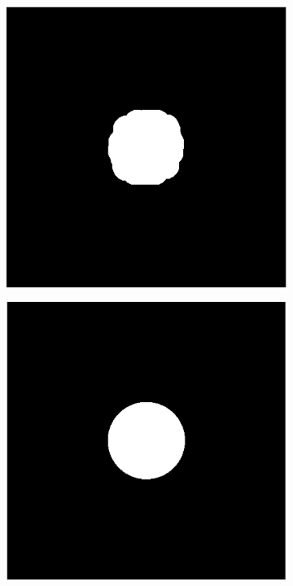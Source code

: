 \documentclass{article}
\begin{document}
\begin{figure}[H]
\begin{subfigure}[b]{0.32\textwidth}
		\caption{}
		\label{fig:step6lpf}
	\end{subfigure}%
	\hspace{\fill}
	\begin{subfigure}[b]{0.32\textwidth}
		\includegraphics[width=\linewidth]{step7}
		\caption{}
		\label{fig:step7lpf}
	\end{subfigure}%
	\hspace{\fill}
	\begin{subfigure}[b]{0.32\textwidth}
		\includegraphics[width=\linewidth]{step8}

\end{subfigure}
\end{figure}
\end{document}
